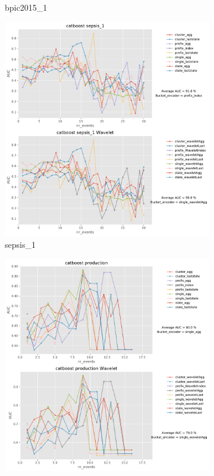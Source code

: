 \documentclass[twoside,11pt]{Latex/Classes/PhDthesisPSnPDF}
\begin{document}
\begin{figure}[!htbp]
\begin{subfigure}{0.48\textwidth}
		\caption{bpic2015\_1}
	\end{subfigure}
	
	\medskip
	\begin{subfigure}{0.48\textwidth}
		\includegraphics[width=\linewidth]{images/wavelet/graphs2cat/sepsis_1.pdf}	
		\caption{sepsis\_1} 
	\end{subfigure}\hspace*{\fill}
	\begin{subfigure}{0.48\textwidth}
		\includegraphics[width=\linewidth]{images/wavelet/graphs2cat/production.pdf}

\end{subfigure}
\end{figure}
\end{document}
